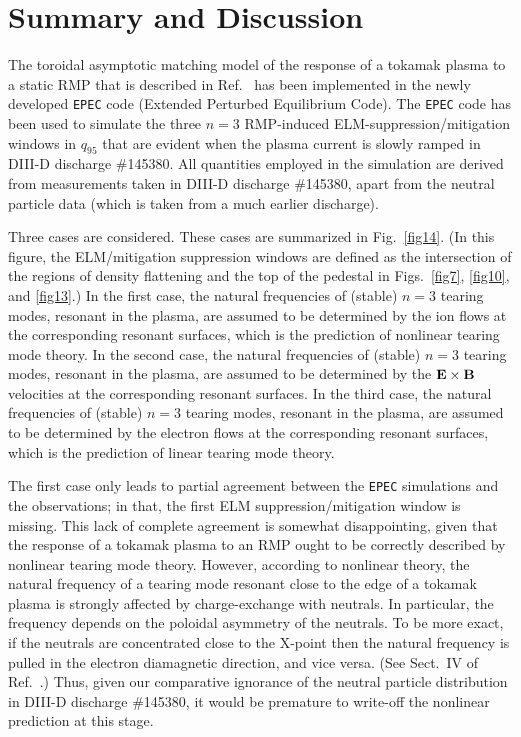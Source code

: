\documentclass[12pt,prb,aps]{revtex4-1}
\begin{document}
\section{Summary and Discussion}
The toroidal asymptotic matching model of the response of a tokamak plasma to a static RMP that is described in Ref.~
has been implemented in the newly developed {\tt EPEC} code (Extended Perturbed Equilibrium Code). The {\tt EPEC} code has  been used to simulate the three $n=3$ RMP-induced ELM-suppression/mitigation
windows in $q_{95}$ that are evident when the plasma current is slowly ramped in DIII-D discharge \#145380. All quantities employed in the simulation are
derived from measurements taken in DIII-D discharge \#145380, apart from the neutral particle data (which is taken from a much earlier discharge).

Three cases are considered. These cases are summarized in Fig.~\ref{fig14}. (In this figure, the ELM/mitigation suppression windows are defined as the intersection of the regions
of density flattening and the top of the pedestal in Figs.~\ref{fig7}, \ref{fig10}, and \ref{fig13}.) In the first case, the natural frequencies of (stable) $n=3$ tearing modes, resonant in the plasma, are assumed to be
determined by the ion flows at the corresponding resonant surfaces, which is the prediction of nonlinear tearing mode theory.\cite{nl1,nl2,nl3}
In the second case, the natural frequencies of (stable) $n=3$ tearing modes, resonant in the plasma, are assumed to be
determined by the ${\bf E}\times {\bf B}$ velocities at the corresponding resonant surfaces.\cite{heyn,paz1} 
In the third case, the natural frequencies of (stable) $n=3$ tearing modes, resonant in the plasma, are assumed to be
determined by the electron flows at the corresponding resonant surfaces, which is the prediction of linear tearing mode theory.\cite{lin1,lin2,lin3}

The first case only leads to partial agreement between  the {\tt EPEC} simulations and the  observations; in that, the first ELM suppression/mitigation window is
missing.  This lack of complete agreement is somewhat
disappointing, given that the response of a tokamak plasma to an RMP ought to be correctly described by nonlinear tearing mode theory. However, according to
nonlinear theory, the natural frequency of a tearing mode resonant close to the edge of a tokamak plasma is strongly affected by charge-exchange with neutrals.\cite{rf2}
In particular, the frequency depends on the poloidal asymmetry of the neutrals. To be more exact, if the neutrals are concentrated close to the X-point then the
natural frequency is pulled in the electron diamagnetic direction, and vice versa.\cite{rf2} (See Sect.~IV of Ref.~.) Thus, given our comparative ignorance of the neutral particle
distribution in DIII-D discharge \#145380, it would be premature to write-off the nonlinear prediction at this stage.  
\end{document}
